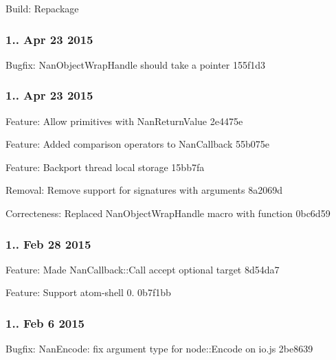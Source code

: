 \begin{DoxyItemize}
\item Build\+: Repackage
\end{DoxyItemize}

\subsubsection*{1.. Apr 23 2015}


\begin{DoxyItemize}
\item Bugfix\+: Nan\+Object\+Wrap\+Handle should take a pointer 155f1d3
\end{DoxyItemize}

\subsubsection*{1.. Apr 23 2015}


\begin{DoxyItemize}
\item Feature\+: Allow primitives with Nan\+Return\+Value 2e4475e
\item Feature\+: Added comparison operators to Nan\+Callback 55b075e
\item Feature\+: Backport thread local storage 15bb7fa
\item Removal\+: Remove support for signatures with arguments 8a2069d
\item Correcteness\+: Replaced Nan\+Object\+Wrap\+Handle macro with function 0bc6d59
\end{DoxyItemize}

\subsubsection*{1.. Feb 28 2015}


\begin{DoxyItemize}
\item Feature\+: Made Nan\+Callback\+::\+Call accept optional target 8d54da7
\item Feature\+: Support atom-\/shell 0. 0b7f1bb
\end{DoxyItemize}

\subsubsection*{1.. Feb 6 2015}


\begin{DoxyItemize}
\item Bugfix\+: Nan\+Encode\+: fix argument type for node\+::\+Encode on io.\+js 2be8639
\end{DoxyItemize}

